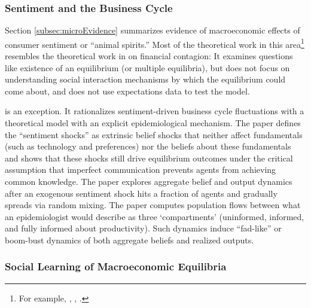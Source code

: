 \subsubsection{Sentiment and the Business Cycle}

Section \ref{subsec:microEvidence} summarizes evidence of macroeconomic effects of consumer sentiment or ``animal spirits.''  Most of the theoretical work in this area\footnote{For example, \cite{angeletos2010noisy}, \cite{benhabib2015sentiments}, \cite{angeletos2018quantifying}.}  resembles the theoretical work in on financial contagion:  It examines questions like existence of an equilibrium (or multiple equilibria), but does not focus on understanding social interaction mechanisms by which the equilibrium could come about, and does not use expectations data to test the model.

\cite{angeletos2013sentiments} is an exception.  It rationalizes sentiment-driven business cycle fluctuations with a theoretical model with an explicit epidemiological mechanism. The paper defines the ``sentiment shocks'' as extrinsic belief shocks that neither affect fundamentals (such as technology and preferences) nor the beliefs about these fundamentals and shows that these shocks still drive equilibrium outcomes under the critical assumption that imperfect communication prevents agents from achieving common knowledge.  The paper explores aggregate belief and output dynamics after an exogenous sentiment shock hits a fraction of agents and gradually spreads via random mixing.  The paper computes  population flows between what an epidemiologist would describe as three `compartments' (uninformed, informed, and fully informed about productivity). Such dynamics induce ``fad-like'' or boom-bust dynamics of both aggregate beliefs and realized outputs.


\subsubsection{Social Learning of Macroeconomic Equilibria}


